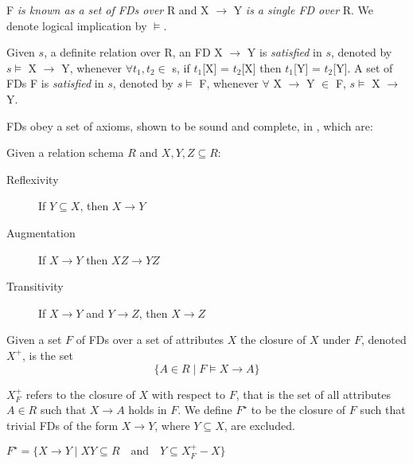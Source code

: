  F {\em is known as a set of FDs over } R and X $\to$ Y 
{\em is  a single FD over } R. We denote logical implication by $\models$.
 
\begin{definition}[Satisfaction of an FD]\label{def:sat}
\begin{rm}
Given $s$,  a definite relation over R,
an FD X $\to$ Y is {\em satisfied} in $s$,
denoted by $s \models$ X $\to$ Y, whenever
$\forall t_1, t_2 \in$ s, if $t_1$[X] = $t_2$[X] then $t_1$[Y] = $t_2$[Y].
A set of FDs F is {\em satisfied} in $s$,
denoted by $s \models$ F, whenever
$\forall$ X $\to$ Y $\in$ F, $s \models$ X $\to$ Y.
\end{rm}
\end{definition}
\medskip
 
FDs obey a set of axioms, shown to be sound and complete, in
\cite{Arms74}, which are:
{\setlength{\baselineskip}{15pt}
\begin{definition}
\begin{rm}
Given a relation schema $R$ and $X,Y,Z \subseteq R$:
\begin{description}
\item[Reflexivity] If $Y \subseteq X$, then $X \to Y$
\item[Augmentation] If $X \to Y$ then $XZ \to YZ$
\item[Transitivity] If $X \to Y$ and $Y \to Z$, then $X \to Z$
\end{description}
\end{rm}
\end{definition}
}

\begin{definition}
\begin{rm}
Given a set $F$ of FDs over a set of attributes $X$ the closure of $X$ under $F$, denoted $X^+$, is the set
\begin{displaymath}
\{ A \in R \mid F \models X \to A \}
\end{displaymath}
\end{rm}
\end{definition}


$X_F^+$ refers to the closure of $X$ with respect to $F$, that is
the set of all attributes $A \in R$ such that $X \to A$ holds in $F$.
We define $F^\star$ to be the closure of $F$ such that trivial
FDs of the form $X \to Y$, where $Y \subseteq X$, are excluded.

\begin{definition}
\begin{rm}
$F^\star = \{ X \to Y \mid XY \subseteq R \quad\mbox{and}\quad Y \subseteq X_F^+ - X \}$
\end{rm}
\end{definition}

